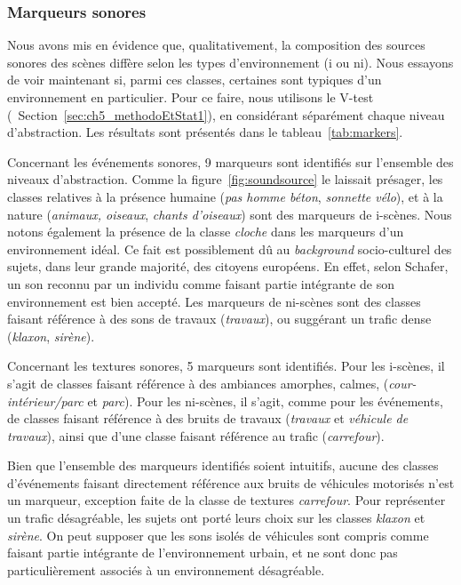 \subsubsection{Marqueurs sonores}
\label{sec:ch5_marqueurXp1}

Nous avons mis en évidence que, qualitativement, la composition des sources sonores des scènes diffère selon les types d'environnement (i ou ni). Nous essayons de voir maintenant si, parmi ces classes, certaines sont typiques d'un environnement en particulier. Pour ce faire, nous utilisons le V-test (\cf~Section~\ref{sec:ch5_methodoEtStat1}), en considérant séparément chaque niveau d'abstraction. Les résultats sont présentés dans le tableau~\ref{tab:markers}.

Concernant les événements sonores, 9 marqueurs sont identifiés sur l'ensemble des niveaux d'abstraction. Comme la figure~\ref{fig:soundsource} le laissait présager, les classes relatives à la présence humaine (\emph{pas homme béton}, \emph{sonnette vélo}), et à la nature (\emph{animaux, oiseaux}, \emph{chants d'oiseaux}) sont des marqueurs de i-scènes. Nous notons également la présence de la classe \emph{cloche} dans les marqueurs d'un environnement idéal. Ce fait est possiblement dû au \emph{background} socio-culturel des sujets, dans leur grande majorité, des citoyens européens. En effet, selon Schafer, un son reconnu par un individu comme faisant partie intégrante de son environnement est bien accepté. Les marqueurs de ni-scènes sont des classes faisant référence à des sons de travaux (\emph{travaux}), ou suggérant un trafic dense (\emph{klaxon}, \emph{sirène}).

Concernant les textures sonores, 5 marqueurs sont identifiés. Pour les i-scènes, il s'agit de classes faisant référence à des ambiances amorphes, calmes, (\emph{cour-intérieur/parc} et \emph{parc}). Pour les ni-scènes, il s'agit, comme pour les événements, de classes faisant référence à des bruits de travaux (\emph{travaux} et \emph{véhicule de travaux}), ainsi que d'une classe faisant référence au trafic (\emph{carrefour}).

Bien que l'ensemble des marqueurs identifiés soient intuitifs, aucune des classes d'événements faisant directement référence aux bruits de véhicules motorisés n'est un marqueur, exception faite de la classe de textures \emph{carrefour}. Pour représenter un trafic désagréable, les sujets ont porté leurs choix sur les classes \emph{klaxon} et \emph{sirène}. On peut supposer que les sons isolés de véhicules sont compris comme faisant partie intégrante de l'environnement urbain, et ne sont donc pas particulièrement associés à un environnement désagréable. \\ 

